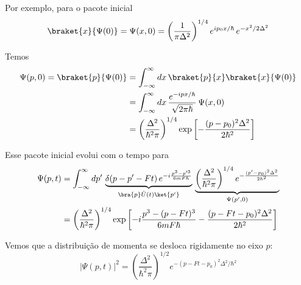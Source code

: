 Por exemplo, para o pacote inicial
\begin{equation}
    \braket{x}{\Psi(0)} = \Psi(x,0) = \left( \frac{1}{\pi\Delta^2} \right)^{1/4} e^{ip_0 x/\hbar}\, e^{-x^2/2\Delta^2}
\label{eq:aula17_pacote_inicial_x}
\end{equation}

Temos
\begin{align}
    \Psi(p,0) = \braket{p}{\Psi(0)} &= \int_{-\infty}^{\infty} dx\, \braket{p}{x}\braket{x}{\Psi(0)} \notag \\
    &= \int_{-\infty}^{\infty} dx\, \frac{e^{-ipx/\hbar}}{\sqrt{2\pi\hbar}}\, \Psi(x,0) \notag \\
    &= \left( \frac{\Delta^2}{\hbar^2\pi} \right)^{1/4} \exp\left[ -\frac{(p-p_0)^2\Delta^2}{2\hbar^2} \right]
\label{eq:aula17_psi_p0}
\end{align}

Esse pacote inicial evolui com o tempo para
\begin{align}
    \Psi(p,t) &= \int_{-\infty}^{\infty} dp'\, \underbrace{\delta(p-p'-Ft)\, e^{-i\frac{p^3-p'^3}{6mF\hbar}}}_{\bra{p}\hat{U}(t)\ket{p'}}\, \underbrace{\left( \frac{\Delta^2}{\hbar^2\pi} \right)^{1/4} e^{-\frac{(p'-p_0)^2\Delta^2}{2\hbar^2}}}_{\Psi(p',0)} \notag \\
    &= \left( \frac{\Delta^2}{\hbar^2\pi} \right)^{1/4} \exp\left[ -i\frac{p^3 - (p-Ft)^3}{6mF\hbar} - \frac{(p-Ft-p_0)^2\Delta^2}{2\hbar^2} \right]
\label{eq:aula17_psi_p_t}
\end{align}

Vemos que a distribuição de momenta se desloca rigidamente no eixo $p$:
\begin{equation}
    |\Psi(p,t)|^2 = \left( \frac{\Delta^2}{\hbar^2\pi} \right)^{1/2} e^{-(p-Ft-p_0)^2\Delta^2/\hbar^2}
\label{eq:aula17_modulo_psi_p_t}
\end{equation}

\begin{center}
\end{center}

